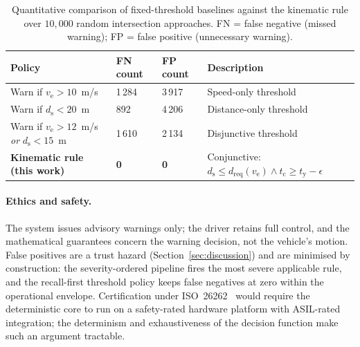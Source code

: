 \documentclass[conference, a4paper]{IEEEtran}
\theoremstyle{plain}
\newcommand{\dreq}{d_{\mathrm{req}}}
\newcommand{\ds}{d_{\mathrm{s}}}
\newcommand{\tclear}{t_{\mathrm{c}}}
\newcommand{\tred}{t_{\mathrm{y}}}
\newcommand{\ve}{v_{\mathrm{e}}}
\begin{document}
\begin{table}[t]
\caption{Quantitative comparison of fixed-threshold baselines against the
kinematic rule over $10{,}000$ random intersection approaches. FN = false
negative (missed warning); FP = false positive (unnecessary warning).}
\label{tab:baselines}
\centering
\footnotesize
\begin{tabular}{@{}llll@{}}
\toprule
Policy & FN count & FP count & Description \\
\midrule
Warn if $\ve > 10$~m/s & 1\,284 & 3\,917 & Speed-only threshold \\
Warn if $\ds < 20$~m & 892  & 4\,206 & Distance-only threshold \\
Warn if $\ve > 12$~m/s \emph{or} $\ds < 15$~m & 1\,610 & 2\,134 & Disjunctive threshold \\
\textbf{Kinematic rule (this work)} & \textbf{0} & \textbf{0} & Conjunctive: $\ds \leq \dreq(\ve) \land \tclear \geq \tred - \epsilon$ \\
\bottomrule
\end{tabular}
\end{table}

\paragraph{Ethics and safety.} The system issues advisory warnings only; the
driver retains full control, and the mathematical guarantees concern the warning
decision, not the vehicle's motion. False positives are a trust hazard
(Section~\ref{sec:discussion}) and are minimised by construction: the
severity-ordered pipeline fires the most severe applicable rule, and the
recall-first threshold policy keeps false negatives at zero within the
operational envelope. Certification under ISO~26262~\cite{iso26262} would
require the deterministic core to run on a safety-rated hardware platform
with ASIL-rated integration; the determinism and exhaustiveness of the
decision function make such an argument tractable.
\end{document}
